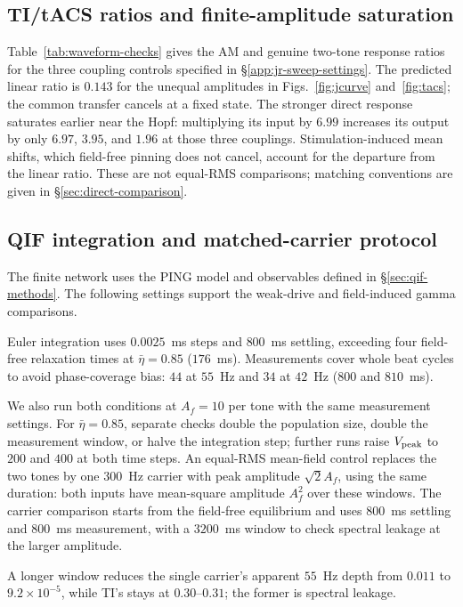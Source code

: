 \documentclass[11pt,a4paper]{article}
\providecommand{\DIFaddtex}[1]{{\protect\color{blue} \sf #1}} %
\providecommand{\DIFaddend}{} %
\providecommand{\DIFadd}[1]{\texorpdfstring{\DIFaddtex{#1}}{#1}} %
\begin{document}
\subsection{\DIFadd{TI/tACS ratios and finite-amplitude saturation}}\label{supp:tacs-saturation}
\DIFadd{Table~\ref{tab:waveform-checks} gives the AM and genuine two-tone response
ratios for the three coupling controls specified in
\S\ref{app:jr-sweep-settings}. The predicted linear ratio is $0.143$ for
the unequal amplitudes in Figs.~\ref{fig:jcurve} and~\ref{fig:tacs}; the
common transfer cancels at a fixed state. The stronger direct response
saturates earlier near the Hopf: multiplying its input by $6.99$ increases
its output by only $6.97$, $3.95$, and $1.96$ at those three couplings.
Stimulation-induced mean shifts, which field-free pinning does not cancel,
account for the departure from the linear ratio. These are not equal-RMS
comparisons; matching conventions are given in \S\ref{sec:direct-comparison}.
}

\subsection{\DIFadd{QIF integration and matched-carrier protocol}}\label{supp:qif-protocol}
\DIFadd{The finite network uses the PING model and observables defined in
\S\ref{sec:qif-methods}. The following settings support the weak-drive and
field-induced gamma comparisons.
}

\DIFadd{Euler integration uses $0.0025$~ms steps and $800$~ms settling, exceeding
four field-free relaxation times at $\bar\eta=0.85$ ($176$~ms).
Measurements cover whole beat cycles to avoid phase-coverage bias:
$44$ at $55$~Hz and $34$ at $42$~Hz ($800$ and $810$~ms).
}

\DIFadd{We also run both conditions at $A_f=10$ per tone with the same measurement
settings. For $\bar\eta=0.85$, separate checks double the population size,
double the measurement window, or halve the integration step; further runs raise
$V_{\rm peak}$ to $200$ and $400$ at both time steps. An equal-RMS
mean-field control replaces the two tones by one $300$~Hz carrier with peak
amplitude $\sqrt{2}A_f$, using the same duration: both inputs have mean-square
amplitude $A_f^2$ over these windows. The carrier comparison starts from the
field-free equilibrium and uses $800$~ms settling and $800$~ms measurement,
with a $3200$~ms window to check spectral leakage at the larger amplitude.
}

\DIFadd{A longer window reduces the single carrier's apparent $55$~Hz
depth from $0.011$ to $9.2\times10^{-5}$, while TI's stays at $0.30$--$0.31$;
the former is spectral leakage}\DIFaddend .
\end{document}
